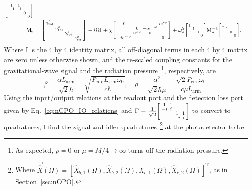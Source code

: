 \begin{align}
\begin{bsmallmatrix}
1 & 1 &  &  \\
-1 & -1 &  &  \\
 &  & 0 &  \\
 &  &  & 0
\end{bsmallmatrix}\\
\text{M}_b&=\begin{bsmallmatrix}
\gamma^b_\mathrm{tot} &  &  &  \\
 & \gamma^b_\mathrm{tot} &  &  \\
 &  & \gamma^c_\mathrm{tot} &  \\
 &  &  & \gamma^c_\mathrm{tot} 
\end{bsmallmatrix}-i\Omega \text{I}+\chi \begin{bsmallmatrix}
0 &  &  & i e^{i\phi} \\
 & 0 & -i e^{-i\phi} &  \\
 & i e^{i\phi} & 0 &  \\
-i e^{-i\phi} &  &  & 0
\end{bsmallmatrix}+\omega_s^2\begin{bsmallmatrix}
1 &  &  &  \\
 & 1 &  &  \\
 &  & 0 &  \\
 &  &  & 0
\end{bsmallmatrix}\text{M}_a^{-1}\begin{bsmallmatrix}
1 &  &  &  \\
 & 1 &  &  \\
 &  & 0 &  \\
 &  &  & 0
\end{bsmallmatrix}.
\end{align}
Where $\text{I}$ is the 4 by 4 identity matrix, all off-diagonal terms in each 4 by 4 matrix are zero unless otherwise shown, and the re-scaled coupling constants for the gravitational-wave signal and the radiation pressure~\footnote{As expected, $\rho=0$ or $\mu=M/4\rightarrow\infty$ turns off the radiation pressure.}, respectively, are
\begin{equation}\label{eq:beta_and_rho}
\beta = \frac{\alpha L_\mathrm{arm}}{\sqrt{2}\hbar}=\sqrt{\frac{ P_\text{circ}L_\text{arm} \omega_0 }{c  \hbar}},\quad \rho = \frac{\alpha^2}{\sqrt{2}\hbar\mu}=\frac{\sqrt{2} P_\text{circ} \omega_0}{c \mu L_\text{arm}}.
\end{equation}
Using the input/output relations at the readout port and the detection loss port given by Eq.~\ref{eq:nOPO_IO_relations} and $\Gamma= \frac{1}{\sqrt2}\begin{bsmallmatrix}
1 & 1 &  &  \\
-i & i &  &  \\
 &  & 1 & 1 \\
 &  & -i & i
\end{bsmallmatrix}$ to convert to quadratures, I find the signal and idler quadratures~\footnote{Where $\vec{\hat X}(\Omega)=[\hat X_{b,1}(\Omega),\hat X_{b,2}(\Omega),\hat X_{c,1}(\Omega),\hat X_{c,2}(\Omega)]^\text{T}$, as in Section~\ref{sec:nOPO}.} at the photodetector to be
